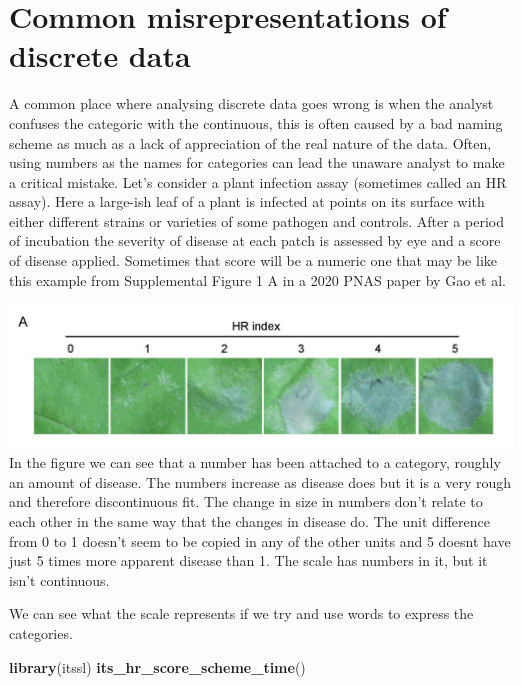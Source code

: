 \documentclass[
]{book}
\newenvironment{Shaded}{\begin{snugshade}}{\end{snugshade}}
\newcommand{\KeywordTok}[1]{\textcolor[rgb]{0.13,0.29,0.53}{\textbf{#1}}}
\newcommand{\NormalTok}[1]{#1}
\begin{document}
\hypertarget{common-misrepresentations-of-discrete-data}{%
\section{Common misrepresentations of discrete data}\label{common-misrepresentations-of-discrete-data}}

A common place where analysing discrete data goes wrong is when the analyst confuses the categoric with the continuous, this is often caused by a bad naming scheme as much as a lack of appreciation of the real nature of the data. Often, using numbers as the names for categories can lead the unaware analyst to make a critical mistake. Let's consider a plant infection assay (sometimes called an HR assay). Here a large-ish leaf of a plant is infected at points on its surface with either different strains or varieties of some pathogen and controls. After a period of incubation the severity of disease at each patch is assessed by eye and a score of disease applied. Sometimes that score will be a numeric one that may be like this example from Supplemental Figure 1 A in a 2020 PNAS paper by Gao et al.~\citet{Gao9613}

\includegraphics{fig/dong_figs1A.png}
In the figure we can see that a number has been attached to a category, roughly an amount of disease. The numbers increase as disease does but it is a very rough and therefore discontinuous fit. The change in size in numbers don't relate to each other in the same way that the changes in disease do. The unit difference from 0 to 1 doesn't seem to be copied in any of the other units and 5 doesnt have just 5 times more apparent disease than 1. The scale has numbers in it, but it isn't continuous.

We can see what the scale represents if we try and use words to express the categories.

\begin{Shaded}
\begin{Highlighting}[]
\KeywordTok{library}\NormalTok{(itssl)}
\KeywordTok{its_hr_score_scheme_time}\NormalTok{()}
\end{Highlighting}
\end{Shaded}
\end{document}
